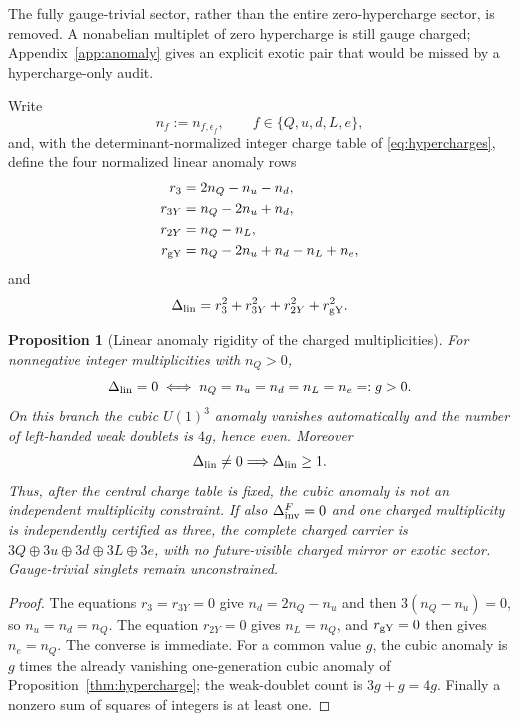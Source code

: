 \documentclass[11pt]{article}
\numberwithin{equation}{section}
\newtheorem{proposition}[theorem]{Proposition}
\theoremstyle{definition}
\theoremstyle{remark}
\begin{document}
The fully gauge-trivial sector, rather than the entire zero-hypercharge
sector, is removed.  A nonabelian multiplet of zero hypercharge is still
gauge charged; Appendix~\ref{app:anomaly} gives an explicit exotic pair that
would be missed by a hypercharge-only audit.

Write
\begin{equation}
 n_f:=n_{f,\epsilon_f},\qquad f\in\{Q,u,d,L,e\},
 \label{eq:charged-multiplicities}
\end{equation}
and, with the determinant-normalized integer charge table of
\eqref{eq:hypercharges}, define the four normalized linear anomaly rows
\begin{align}
 r_3&=2n_Q-n_u-n_d,\nonumber\\
 r_{3Y}&=n_Q-2n_u+n_d,\nonumber\\
 r_{2Y}&=n_Q-n_L,\nonumber\\
 r_{\rm gY}&=n_Q-2n_u+n_d-n_L+n_e,
 \label{eq:linear-anomaly-rows}
\end{align}
and
\begin{equation}
 \Delta_{\rm lin}
 =r_3^2+r_{3Y}^2+r_{2Y}^2+r_{\rm gY}^2.
 \label{eq:linear-anomaly-residual}
\end{equation}

\begin{proposition}[Linear anomaly rigidity of the charged multiplicities]
\label{thm:linear-anomaly-rigidity}
For nonnegative integer multiplicities with $n_Q>0$,
\begin{equation}
 \Delta_{\rm lin}=0
 \iff n_Q=n_u=n_d=n_L=n_e=:g>0.
 \label{eq:linear-anomaly-common-count}
\end{equation}
On this branch the cubic $U(1)^3$ anomaly vanishes automatically and the
number of left-handed weak doublets is $4g$, hence even.  Moreover
\begin{equation}
 \Delta_{\rm lin}\ne0\Longrightarrow\Delta_{\rm lin}\ge1.
 \label{eq:linear-anomaly-integer-gap}
\end{equation}
Thus, after the central charge table is fixed, the cubic anomaly is not an
independent multiplicity constraint.
If also $\Delta_{\rm inv}^F=0$ and one charged multiplicity is independently
certified as three, the complete charged carrier is
$3Q\oplus3u\oplus3d\oplus3L\oplus3e$, with no future-visible charged
mirror or exotic sector.  Gauge-trivial singlets remain unconstrained.
\end{proposition}

\begin{proof}
The equations $r_3=r_{3Y}=0$ give
$n_d=2n_Q-n_u$ and then $3(n_Q-n_u)=0$, so
$n_u=n_d=n_Q$.  The equation $r_{2Y}=0$ gives $n_L=n_Q$, and
$r_{\rm gY}=0$ then gives $n_e=n_Q$.  The converse is immediate.  For a common
value $g$, the cubic anomaly is $g$ times the already vanishing one-generation
cubic anomaly of Proposition~\ref{thm:hypercharge}; the weak-doublet count is
$3g+g=4g$.  Finally a nonzero sum of squares of integers is at least one.
\end{proof}
\end{document}
